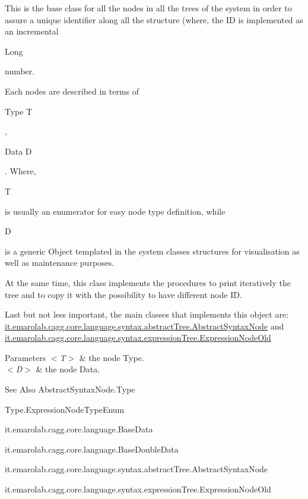 This is the base class for all the nodes in all the trees of the system in order to assure a unique identifier along all the structure (where, the I\-D is implemented as an incremental
\begin{DoxyCode}
Long 
\end{DoxyCode}
 number.\par


Each nodes are described in terms of
\begin{DoxyCode}
Type T 
\end{DoxyCode}
 ,
\begin{DoxyCode}
Data D 
\end{DoxyCode}
 . Where,
\begin{DoxyCode}
T 
\end{DoxyCode}
 is usually an enumerator for easy node type definition, while
\begin{DoxyCode}
D 
\end{DoxyCode}
 is a generic Object templated in the system classes structures for visualisation as well as maintenance purposes.\par


At the same time, this class implements the procedures to print iteratively the tree and to copy it with the possibility to have different node I\-D.\par


Last but not less important, the main classes that implements this object are\-: \hyperlink{}{it.\-emarolab.\-cagg.\-core.\-language.\-syntax.\-abstract\-Tree.\-Abstract\-Syntax\-Node} and \hyperlink{}{it.\-emarolab.\-cagg.\-core.\-language.\-syntax.\-expression\-Tree.\-Expression\-Node\-Old}


\begin{DoxyParams}{Parameters}
{\em $<$\-T$>$} & the node Type. \\
\hline
{\em $<$\-D$>$} & the node Data.\\
\hline
\end{DoxyParams}
\begin{DoxySeeAlso}{See Also}
Abstract\-Syntax\-Node.\-Type 

Type.\-Expression\-Node\-Type\-Enum 

it.\-emarolab.\-cagg.\-core.\-language.\-Base\-Data 

it.\-emarolab.\-cagg.\-core.\-language.\-Base\-Double\-Data 

it.\-emarolab.\-cagg.\-core.\-language.\-syntax.\-abstract\-Tree.\-Abstract\-Syntax\-Node 

it.\-emarolab.\-cagg.\-core.\-language.\-syntax.\-expression\-Tree.\-Expression\-Node\-Old 
\end{DoxySeeAlso}


